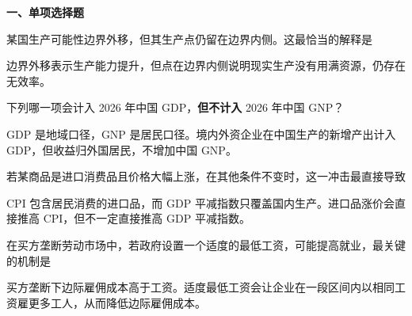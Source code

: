 ﻿


\textbf{一、单项选择题}

\begin{question}
某国生产可能性边界外移，但其生产点仍留在边界内侧。这最恰当的解释是
\begin{choiceoptions}[2]
\end{choiceoptions}
\begin{solution}
边界外移表示生产能力提升，但点在边界内侧说明现实生产没有用满资源，仍存在无效率。
\end{solution}
\end{question}

\begin{question}
下列哪一项会计入 2026 年中国 GDP，\textbf{但不计入} 2026 年中国 GNP？
\begin{choiceoptions}[1]
\end{choiceoptions}
\begin{solution}
GDP 是地域口径，GNP 是居民口径。境内外资企业在中国生产的新增产出计入 GDP，但收益归外国居民，不增加中国 GNP。
\end{solution}
\end{question}

\begin{question}
若某商品是进口消费品且价格大幅上涨，在其他条件不变时，这一冲击最直接导致
\begin{choiceoptions}[2]
\end{choiceoptions}
\begin{solution}
CPI 包含居民消费的进口品，而 GDP 平减指数只覆盖国内生产。进口品涨价会直接推高 CPI，但不一定直接推高 GDP 平减指数。
\end{solution}
\end{question}

\begin{question}
在买方垄断劳动市场中，若政府设置一个适度的最低工资，可能提高就业，最关键的机制是
\begin{choiceoptions}[2]
\end{choiceoptions}
\begin{solution}
买方垄断下边际雇佣成本高于工资。适度最低工资会让企业在一段区间内以相同工资雇更多工人，从而降低边际雇佣成本。
\end{solution}
\end{question}

